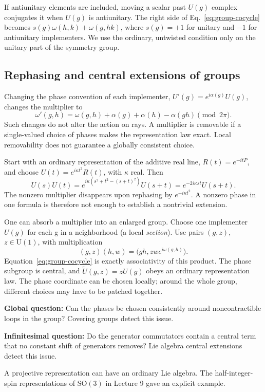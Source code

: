 \documentclass[11pt]{article}
\newcommand{\SO}{\mathrm{SO}}
\newcommand{\UU}{\mathrm{U}}
\begin{document}
If antiunitary elements are included, moving a scalar past \(U(g)\)
complex conjugates it when \(U(g)\) is antiunitary. The right side of
Eq.~\eqref{eq:group-cocycle} becomes
\(s(g)\omega(h,k)+\omega(g,hk)\), where \(s(g)=+1\) for unitary and
\(-1\) for antiunitary implementers. We use the ordinary, untwisted
condition only on the unitary part of the symmetry group.

\subsection{Rephasing and central extensions of groups}
Changing the phase convention of each implementer,
\(U'(g)=e^{i\alpha(g)}U(g)\), changes the multiplier to
\begin{equation}
 \omega'(g,h)=\omega(g,h)+\alpha(g)+\alpha(h)-\alpha(gh)
 \pmod{2\pi}.
 \label{eq:coboundary}
\end{equation}
Such changes do not alter the action on rays. A multiplier is removable
if a single-valued choice of phases makes the representation law exact.
Local removability does not guarantee a globally consistent choice.

\begin{remarkbox}
Start with an ordinary representation of the additive real line,
\(R(t)=e^{-itP}\), and choose \(U(t)=e^{i\kappa t^2}R(t)\), with
\(\kappa\) real. Then
\[
 U(s)U(t)=e^{i\kappa(s^2+t^2-(s+t)^2)}U(s+t)
         =e^{-2i\kappa st}U(s+t).
\]
The nonzero multiplier disappears upon rephasing by
\(e^{-i\kappa t^2}\). A nonzero phase in one formula is therefore
not enough to establish a nontrivial extension.
\end{remarkbox}

One can absorb a multiplier into an enlarged group. Choose one
implementer \(U(g)\) for each g in a neighborhood (a local
\emph{section}). Use pairs \((g,z)\), \(z\in\UU(1)\), with multiplication
\begin{equation}
 (g,z)(h,w)=\bigl(gh,zw e^{i\omega(g,h)}\bigr).
 \label{eq:extension-product}
\end{equation}
Equation~\eqref{eq:group-cocycle} is exactly associativity of this product.
The phase subgroup is central, and
\(\widetilde U(g,z)=zU(g)\) obeys an ordinary representation law.
The phase coordinate can be chosen locally; around the whole group,
different choices may have to be patched together.

\begin{keyidea}
\textbf{Global question:} Can the phases be chosen consistently around
noncontractible loops in the group? Covering groups detect this issue.

\textbf{Infinitesimal question:} Do the generator commutators contain a
central term that no constant shift of generators removes?
Lie algebra central extensions detect this issue.

A projective representation can have an ordinary Lie algebra. The
half-integer-spin representations of \(\SO(3)\) in Lecture 9 gave an
explicit example.
\end{keyidea}
\end{document}
